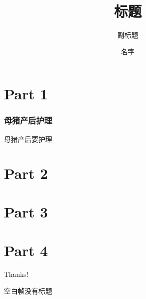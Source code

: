 \documentclass{beamer}
\title[短标题]{标题}
\subtitle{副标题}
\author{名字}
\institute[短的机构名称]{机构名称}
\begin{document}
	
	\begin{frame}
		\titlepage
	\end{frame}
	
	\begin{frame}
		\tableofcontents[sectionstyle=show,subsectionstyle=show/shaded/hide,subsubsectionstyle=show/shaded/hide]
	\end{frame}
	
	\section{Part 1}
	\begin{frame}\frametitle{母猪产后护理}
		母猪产后要护理
	\end{frame}
	\section{Part 2}
	\section{Part 3}
	\section{Part 4}
	
	\begin{frame}
		\begin{center}
			{\Huge Thanks!}
		\end{center}
	\end{frame}
	
	\begin{frame}[plain]
		空白帧没有标题
	\end{frame}
	
\end{document}
